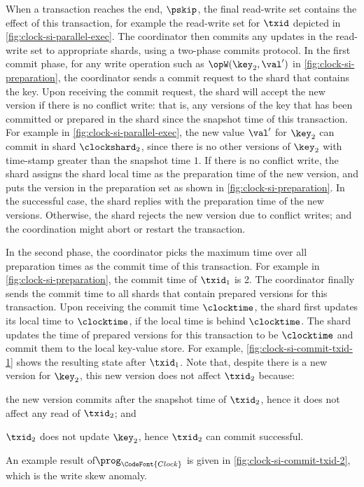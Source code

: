 When a transaction reaches the end, \( \pskip \),
the final read-write set contains the effect of this transaction,
for example the read-write set for \( \txid \) depicted in \cref{fig:clock-si-parallel-exec}.
The coordinator then commits any updates in the read-write set to appropriate shards,
using a two-phase commits protocol.
In the first commit phase, for any write operation such as \( \opW(\key_2,\val')\) in \cref{fig:clock-si-preparation},
the coordinator sends a commit request to the shard that contains the key.
Upon receiving the commit request,
the shard  will accept the new version if there is no conflict write:
that is, any versions of the key that has been committed or prepared in the shard
since the snapshot time of this transaction.
For example in \cref{fig:clock-si-parallel-exec},
the new value \( \val' \) for \( \key_2 \) can commit in shard \( \clockshard_2 \),
since there is no other versions of \( \key_2 \) with time-stamp greater than the snapshot time \( 1 \).
If there is no conflict write, 
the shard assigns the shard local time as the preparation time of the new version,
and puts the version in the preparation set as shown in \cref{fig:clock-si-preparation}.
In the successful case, 
the shard replies with the preparation time of the new versions.
Otherwise, the shard rejects the new version due to conflict writes; and
the coordination might abort or restart the transaction.

In the second phase,
the coordinator picks the maximum time over all preparation times as the commit time of this transaction.
For example in \cref{fig:clock-si-preparation}, the commit time of \( \txid_1 \) is 2.
The coordinator finally sends the commit time to all shards 
that contain prepared versions for this transaction.
Upon receiving the commit time \( \clocktime \), 
the shard first updates its local time to \( \clocktime \), if the local time is behind \( \clocktime \).
The shard updates the time of prepared versions for this transaction to be \( \clocktime \) 
and commit them to the local key-value store.
For example, \cref{fig:clock-si-commit-txid-1} shows the resulting state after \( \txid_1 \).
Note that, despite there is a new version for \( \key_2 \), this new version does not affect \( \txid_2 \) 
because:
\begin{enumerate*}
\item the new version commits after the snapshot time of \( \txid_2 \),
hence it does not affect any read of \( \txid_2 \); and 
\item \( \txid_2 \) does not update \( \key_2 \), hence \( \txid_2 \) can commit successful.
\end{enumerate*}
An example result of\( \prog_{\CodeFont{Clock}} \) is given in \cref{fig:clock-si-commit-txid-2},
which is the write skew anomaly.

